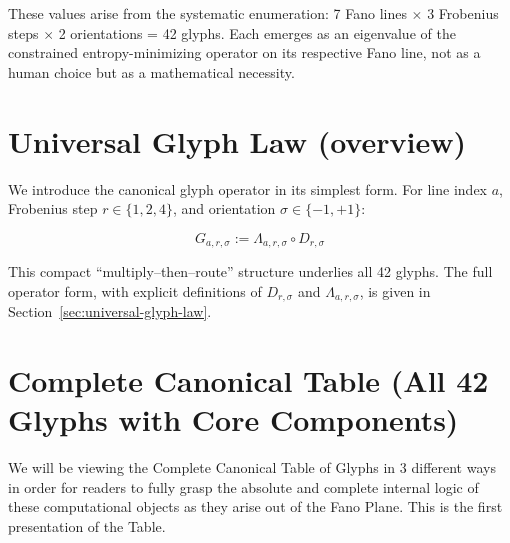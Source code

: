 \documentclass[pdflatex,sn-mathphys-num]{sn-jnl}
\theoremstyle{thmstyleone}
\theoremstyle{thmstyletwo}
\theoremstyle{thmstylethree}
\begin{document}
\bigskip These values arise from the systematic enumeration: 7 Fano lines $\times$ 3 Frobenius steps $\times$ 2 orientations = 42 glyphs. Each emerges as an eigenvalue of the constrained entropy-minimizing operator on its respective Fano line, not as a human choice but as a mathematical necessity.


\section{Universal Glyph Law (overview)}\label{sec:universal-glyph-law-overview}

We introduce the canonical glyph operator in its simplest form.  
For line index $a$, Frobenius step $r \in \{1,2,4\}$, and orientation $\sigma \in \{-1,+1\}$:

\[
\boxed{\quad
G_{a,r,\sigma} := \Lambda_{a,r,\sigma} \circ D_{r,\sigma}
\quad}
\]

This compact “multiply–then–route” structure underlies all 42 glyphs.  
The full operator form, with explicit definitions of $D_{r,\sigma}$ and $\Lambda_{a,r,\sigma}$,  
is given in Section~\ref{sec:universal-glyph-law}.


\section{Complete Canonical Table (All 42 Glyphs with Core Components)}

We will be viewing the Complete Canonical Table of Glyphs in 3 different ways in order for readers to fully grasp the absolute and complete internal logic of these computational objects as they arise out of the Fano Plane. This is the first presentation of the Table.
 
\end{document}

